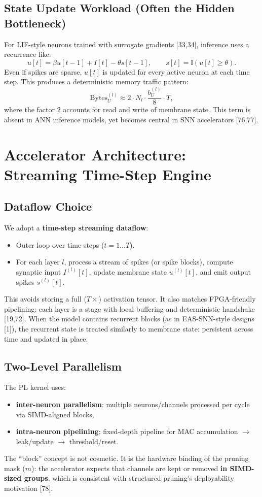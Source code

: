 \documentclass[10pt,journal,compsoc]{IEEEtran}
\begin{document}
\subsection{State Update Workload (Often the Hidden Bottleneck)}
For LIF-style neurons trained with surrogate gradients [33,34], inference uses a recurrence like:
\begin{equation}
u[t] = \beta u[t-1] + I[t] - \theta s[t-1],\qquad
s[t]=\mathbb{I}(u[t]\ge \theta).
\end{equation}
Even if spikes are sparse, $u[t]$ is updated for every active neuron at each time step. This produces a deterministic memory traffic pattern:
\begin{equation}
\text{Bytes}_{U}^{(l)} \approx 2 \cdot N_l \cdot \frac{b_U^{(l)}}{8}\cdot T,
\end{equation}
where the factor 2 accounts for read and write of membrane state. This term is absent in ANN inference models, yet becomes central in SNN accelerators [76,77].

\section{Accelerator Architecture: Streaming Time-Step Engine}

\subsection{Dataflow Choice}
We adopt a \textbf{time-step streaming dataflow}:
\begin{itemize}
    \item Outer loop over time steps ($t=1\ldots T$).
    \item For each layer $l$, process a stream of spikes (or spike blocks), compute synaptic input $I^{(l)}[t]$, update membrane state $u^{(l)}[t]$, and emit output spikes $s^{(l)}[t]$.
\end{itemize}
This avoids storing a full ($T\times$) activation tensor. It also matches FPGA-friendly pipelining: each layer is a stage with local buffering and deterministic handshake [19,72]. When the model contains recurrent blocks (as in EAS-SNN-style designs [1]), the recurrent state is treated similarly to membrane state: persistent across time and updated in place.

\subsection{Two-Level Parallelism}
The PL kernel uses:
\begin{itemize}
    \item \textbf{inter-neuron parallelism}: multiple neurons/channels processed per cycle via SIMD-aligned blocks,
    \item \textbf{intra-neuron pipelining}: fixed-depth pipeline for MAC accumulation $\to$ leak/update $\to$ threshold/reset.
\end{itemize}
The ``block'' concept is not cosmetic. It is the hardware binding of the pruning mask ($m$): the accelerator expects that channels are kept or removed \textbf{in SIMD-sized groups}, which is consistent with structured pruning's deployability motivation [78].
\end{document}
